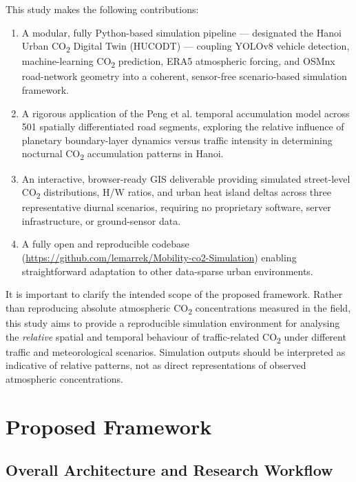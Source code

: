 \documentclass[12pt,a4paper]{article}
\begin{document}
This study makes the following contributions:
\begin{enumerate}[label=(\arabic*)]
  \item A modular, fully Python-based simulation pipeline --- designated the Hanoi Urban CO\textsubscript{2} Digital Twin (HUCODT) --- coupling YOLOv8 vehicle detection, machine-learning CO\textsubscript{2} prediction, ERA5 atmospheric forcing, and OSMnx road-network geometry into a coherent, sensor-free scenario-based simulation framework.
  \item A rigorous application of the Peng et al. \cite{Peng2023} temporal accumulation model across 501 spatially differentiated road segments, exploring the relative influence of planetary boundary-layer dynamics versus traffic intensity in determining nocturnal CO\textsubscript{2} accumulation patterns in Hanoi.
  \item An interactive, browser-ready GIS deliverable providing simulated street-level CO\textsubscript{2} distributions, H/W ratios, and urban heat island deltas across three representative diurnal scenarios, requiring no proprietary software, server infrastructure, or ground-sensor data.
  \item A fully open and reproducible codebase (\url{https://github.com/lemarrek/Mobility-co2-Simulation}) enabling straightforward adaptation to other data-sparse urban environments.
\end{enumerate}

It is important to clarify the intended scope of the proposed framework. Rather than reproducing absolute atmospheric CO\textsubscript{2} concentrations measured in the field, this study aims to provide a reproducible simulation environment for analysing the \emph{relative} spatial and temporal behaviour of traffic-related CO\textsubscript{2} under different traffic and meteorological scenarios. Simulation outputs should be interpreted as indicative of relative patterns, not as direct representations of observed atmospheric concentrations.

\section{Proposed Framework}

\subsection{Overall Architecture and Research Workflow}
\end{document}
